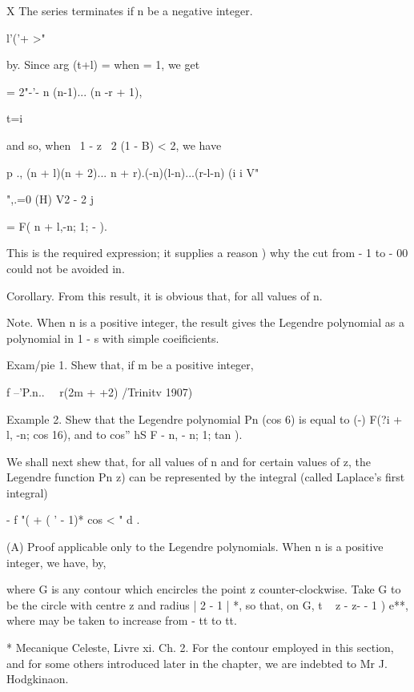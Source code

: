 {{X The series terminates if n be a negative integer.

l'('+ >"

%
%

by. Since arg (t+l) = when = 1, we get

= 2"-'- n (n-1)... (n -r + 1),

t=i

and so, when \ 1 - z \ 2 (1 - B) < 2, we have

p ., (n + l)(n + 2)... n + r).(-n)(l-n)...(r-l-n) (i i V"

   ",.=0 (H) V2 - 2 j

= F( n + l,-n; 1; - ).

This is the required expression; it supplies a reason ) why
the cut from - 1 to - 00 could not be avoided in.

Corollary. From this result, it is obvious that, for all values of n.

Note. When n is a positive integer, the result gives the Legendre
polynomial as a polynomial in 1 - s with simple coeificients.

Exam/pie 1. Shew that, if m be a positive integer,

f --'P.n.. \ \ r(2m + +2) /Trinitv 1907)

Example 2. Shew that the Legendre polynomial Pn (cos 6) is equal to
(-) F(?i + l, -n; \; cos 16), and to cos'' hS F - n, - n; 1; tan ).


We shall next shew that, for all values of n and for certain values of
z, the Legendre function Pn z) can be represented by the integral
(called Laplace's first integral)

- f "( + ( ' - 1)* cos < " d .

(A) Proof applicable only to the Legendre polynomials. When n is a
positive integer, we have, by,

where G is any contour which encircles the point z counter-clockwise.
Take G to be the circle with centre z and radius | 2 - 1 | *, so that,
on G, t ~ z - z- - 1 ) e**, where may be taken to increase from - tt
to tt.

* Mecanique Celeste, Livre xi. Ch. 2. For the contour employed in this
section, and for some others introduced later in the chapter, we are
indebted to Mr J. Hodgkinaon.

}}
